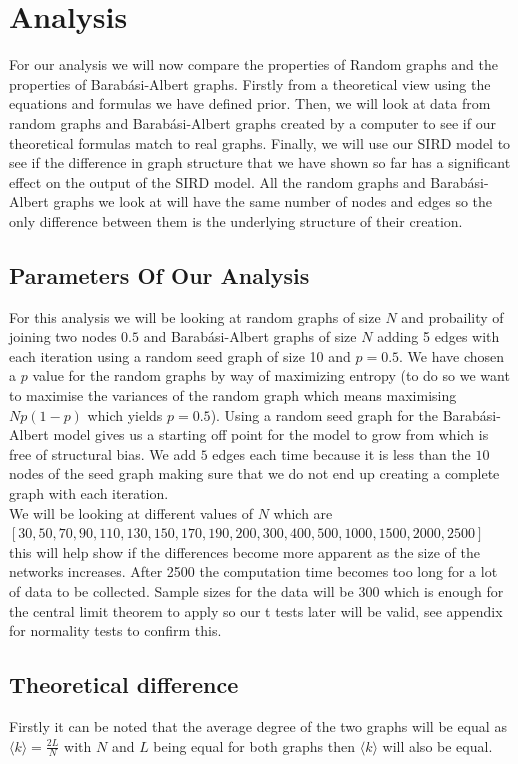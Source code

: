 \documentclass{article}
\begin{document}
        \section{Analysis}
            For our analysis we will now compare the properties of Random graphs and the properties of Barabási-Albert graphs. Firstly from a theoretical view using the equations and formulas we have defined prior. Then, we will look at data from random graphs and Barabási-Albert graphs created by a computer to see if our theoretical formulas match to real graphs. Finally, we will use our SIRD model to see if the difference in graph structure that we have shown so far has a significant effect on the output of the SIRD model. All the random graphs and Barabási-Albert graphs we look at will have the same number of nodes and edges so the only difference between them is the underlying structure of their creation.
            \subsection{Parameters Of Our Analysis}
            For this analysis we will be looking at random graphs of size $N$ and probaility of joining two nodes $0.5$ and Barabási-Albert graphs of size $N$ adding 5 edges with each iteration using a random seed graph of size 10 and $p=0.5$. We have chosen a $p$ value for the random graphs by way of maximizing entropy (to do so we want to maximise the variances of the random graph which means maximising $Np(1-p)$ which yields $p = 0.5$). Using a random seed graph for the Barabási-Albert model gives us a starting off point for the model to grow from which is free of structural bias. We add $5$ edges each time because it is less than the $10$ nodes of the seed graph making sure that we do not end up creating a complete graph with each iteration.\\ 
            We will be looking at different values of $N$ which are\\ $ [30,50,70,90,110,130,150,170,190,200,300,400,500,1000,1500,2000,2500]$\\ this will help show if the differences become more apparent as the size of the networks increases. After 2500 the computation time becomes too long for a lot of data to be collected. Sample sizes for the data will be 300 which is enough for the central limit theorem to apply so our t tests later will be valid, see appendix for normality tests to confirm this.
            \subsection{Theoretical difference}
            Firstly it can be noted that the average degree of the two graphs will be equal as $\langle k \rangle = \frac{2L}{N}$ with $N$ and $L$ being equal for both graphs then $\langle k \rangle$ will also be equal.
\end{document}
